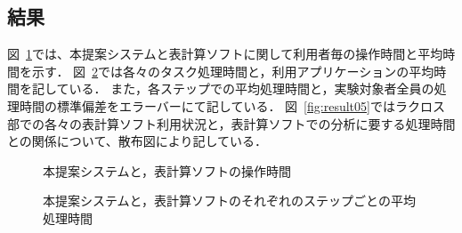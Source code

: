 \documentclass[sotsuron]{kuee}
\begin{document}
		\subsection{結果}
			図~\ref{fig:result03}では、本提案システムと表計算ソフトに関して利用者毎の操作時間と平均時間を示す．
			図~\ref{fig:result04}では各々のタスク処理時間と，利用アプリケーションの平均時間を記している．
			また，各ステップでの平均処理時間と，実験対象者全員の処理時間の標準偏差をエラーバーにて記している．
			図~\ref{fig:result05}ではラクロス部での各々の表計算ソフト利用状況と，表計算ソフトでの分析に要する処理時間との関係について、散布図により記している．
			\begin{figure}
				\begin{center}
				\end{center}
				\caption{本提案システムと，表計算ソフトの操作時間}
		  		\label{fig:result03}
			\end{figure}
			\begin{figure}
				\begin{center}
				\end{center}
				\caption{本提案システムと，表計算ソフトのそれぞれのステップごとの平均処理時間}
		  		\label{fig:result04}
			\end{figure}
\end{document}
